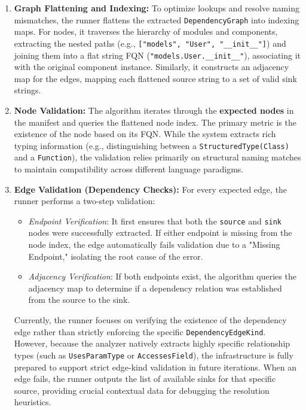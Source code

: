 \begin{enumerate}
  \item \textbf{Graph Flattening and Indexing:} To optimize lookups
    and resolve naming mismatches, the runner flattens the extracted
    \texttt{DependencyGraph} into indexing maps. For nodes, it
    traverses the hierarchy of modules and components, extracting the
    nested paths (e.g., \texttt{["models", "User", "\_\_init\_\_"]})
    and joining them into a flat string FQN
    (\texttt{"models.User.\_\_init\_\_"}), associating it with the
    original component instance. Similarly, it constructs an
    adjacency map for the edges, mapping each flattened source string
    to a set of valid sink strings.

  \item \textbf{Node Validation:} The algorithm iterates through the
    \textbf{expected nodes} in the manifest and queries the flattened
    node index. The primary metric is the existence of the node based
    on its FQN. While the system extracts rich typing information
    (e.g., distinguishing between a \texttt{StructuredType(Class)}
    and a \texttt{Function}), the validation relies primarily on
    structural naming matches to maintain compatibility across
    different language paradigms.

  \item \textbf{Edge Validation (Dependency Checks):} For every
    expected edge, the runner performs a two-step validation:
    \begin{itemize}
      \item \textit{Endpoint Verification}: It first ensures that
        both the \texttt{source} and \texttt{sink} nodes were
        successfully extracted. If either endpoint is missing from
        the node index, the edge automatically fails validation due
        to a "Missing Endpoint," isolating the root cause of the error.
      \item \textit{Adjacency Verification}: If both endpoints exist,
        the algorithm queries the adjacency map to determine if a
        dependency relation was established from the source to the sink.
    \end{itemize}
    Currently, the runner focuses on verifying the existence of the
    dependency edge rather than strictly enforcing the specific
    \texttt{DependencyEdgeKind}. However, because the analyzer
    natively extracts highly specific relationship types (such as
    \texttt{UsesParamType} or \texttt{AccessesField}), the
    infrastructure is fully prepared to support strict edge-kind
    validation in future iterations. When an edge fails, the runner
    outputs the list of available sinks for that specific source,
    providing crucial contextual data for debugging the resolution heuristics.
\end{enumerate}

